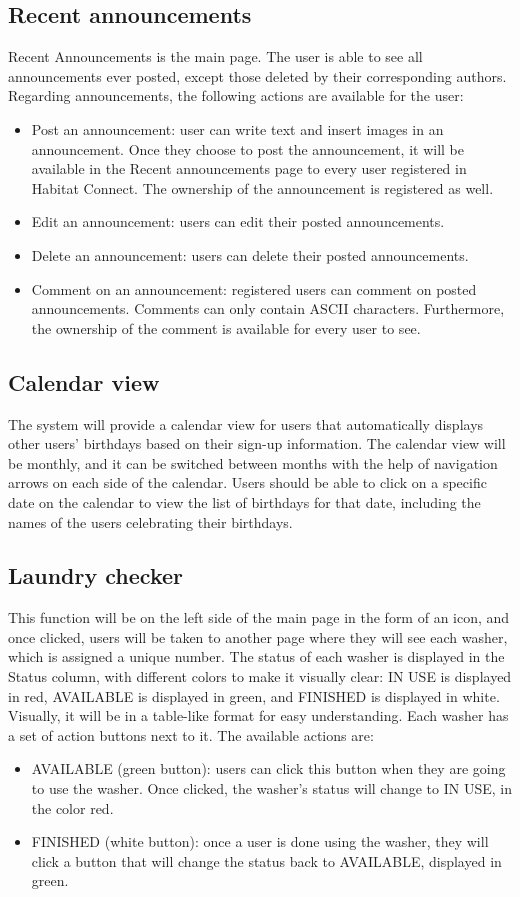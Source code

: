 \documentclass[conference]{IEEEtran}
\begin{document}
\subsection{Recent announcements}
Recent Announcements is the main page. The user is able to see all announcements ever posted, except those deleted by their corresponding authors. Regarding announcements, the following actions are available for the user:
\begin{itemize}
    \item Post an announcement: user can write text and insert images in an announcement. Once they choose to post the announcement, it will be available in the Recent announcements page to every user registered in Habitat Connect. The ownership of the announcement is registered as well.
    \item Edit an announcement: users can edit their posted announcements.
    \item Delete an announcement: users can delete their posted announcements.
    \item Comment on an announcement: registered users can comment on posted announcements. Comments can only contain ASCII characters. Furthermore, the ownership of the comment is available for every user to see.
\end{itemize}
\subsection{Calendar view}
The system will provide a calendar view for users that automatically displays other users' birthdays based on their sign-up information. The calendar view will be monthly, and it can be switched between months with the help of navigation arrows on each side of the calendar. Users should be able to click on a specific date on the calendar to view the list of birthdays for that date, including the names of the users celebrating their birthdays.
\subsection{Laundry checker}
This function will be on the left side of the main page in the form of an icon, and once clicked, users will be taken to another page where they will see each washer, which is assigned a unique number. The status of each washer is displayed in the Status column, with different colors to make it visually clear: IN USE is displayed in red, AVAILABLE is displayed in green, and FINISHED is displayed in white. Visually, it will be in a table-like format for easy understanding. Each washer has a set of action buttons next to it. The available actions are:
\begin{itemize}
    \item AVAILABLE (green button): users can click this button when they are going to use the washer. Once clicked, the washer’s status will change to IN USE, in the color red.
    \item FINISHED (white button): once a user is done using the washer, they will click a button that will change the status back to AVAILABLE, displayed in green.
\end{itemize}
\end{document}
